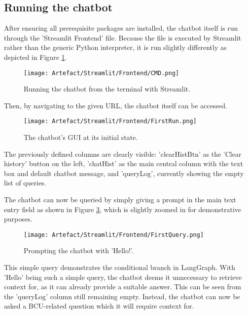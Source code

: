 \newpage 

\subsection{Running the chatbot}\label{sec:ChatbotRun}
After ensuring all prerequisite packages are installed, the chatbot itself is run through the 'Streamlit Frontend' file. Because the file 
is executed by Streamlit rather than the generic Python interpreter, it is run slightly differently as depicted in Figure \ref{fig:RunApp}.

\begin{figure}[H]
    \centering
    \texttt{[image: Artefact/Streamlit/Frontend/CMD.png]}
    \caption{Running the chatbot from the terminal with Streamlit. \label{fig:RunApp}}
\end{figure}

\noindent Then, by navigating to the given URL, the chatbot itself can be accessed.

\begin{figure}[H]
    \centering
    \texttt{[image: Artefact/Streamlit/Frontend/FirstRun.png]}
    \caption{The chatbot's GUI at its initial state. \label{fig:FirstRun}}
\end{figure}

\noindent The previously defined columns are clearly visible: 'clearHistBtn' as the 'Clear history' button on the left, 'chatHist' as the main 
central column with the text box and default chatbot message, and 'queryLog', currently showing the empty list of queries. 

\para The chatbot can now be queried by simply giving a prompt in the main text entry field as shown in Figure \ref{fig:FirstQuery}, 
which is slightly zoomed in for demonstrative purposes.

\begin{figure}[H]
    \centering
    \texttt{[image: Artefact/Streamlit/Frontend/FirstQuery.png]}
    \caption{Prompting the chatbot with 'Hello!'. \label{fig:FirstQuery}}
\end{figure}

\noindent This simple query demonstrates the conditional branch in LangGraph. With 'Hello' being such a simple query, the chatbot deems 
it unnecessary to retrieve context for, as it can already provide a suitable answer. This can be seen from the 'queryLog' column still 
remaining empty. Instead, the chatbot can now be asked a BCU-related question which it will require context for.

